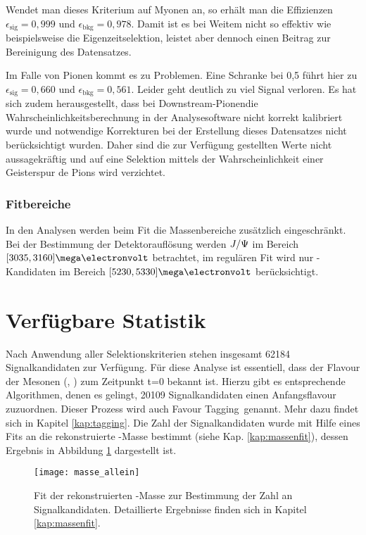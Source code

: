 Wendet man dieses Kriterium auf Myonen an, so erhält man die Effizienzen $\epsilon_{\text{sig}}=0,999$ und $\epsilon_{\text{bkg}}=0,978$. Damit ist es bei Weitem nicht so effektiv wie beispielsweise die Eigenzeitselektion, leistet aber dennoch einen Beitrag zur Bereinigung des Datensatzes.

Im Falle von Pionen kommt es zu Problemen. Eine Schranke bei 0,5 führt hier zu $\epsilon_{\text{sig}}=0,660$ und $\epsilon_{\text{bkg}}=0,561$. Leider geht deutlich zu viel Signal verloren. Es hat sich zudem herausgestellt, dass bei \glqq Downstream-Pionen\grqq die Wahrscheinlichkeitsberechnung in der Analysesoftware nicht korrekt kalibriert wurde und notwendige Korrekturen bei der Erstellung dieses Datensatzes nicht berücksichtigt wurden. Daher sind die zur Verfügung gestellten Werte nicht aussagekräftig und auf eine Selektion mittels der Wahrscheinlichkeit einer Geisterspur de Pions wird verzichtet.

\subsubsection{Fitbereiche}
In den Analysen werden beim Fit die Massenbereiche zusätzlich eingeschränkt. Bei der Bestimmung der Detektorauflösung werden $J/\Psi$ im Bereich $[3035, 3160]\mega\electronvolt$ betrachtet, im regulären Fit wird nur \Bd-Kandidaten im Bereich $[5230, 5330]\mega\electronvolt$ berücksichtigt.

\section{Verfügbare Statistik}
Nach Anwendung aller Selektionskriterien stehen insgesamt 62184 Signalkandidaten zur Verfügung. Für diese Analyse ist essentiell, dass der Flavour der Mesonen (\Bd, \Bdbar) zum Zeitpunkt t=0 bekannt ist. Hierzu gibt es entsprechende Algorithmen, denen es gelingt, 20109 Signalkandidaten einen Anfangsflavour zuzuordnen. Dieser Prozess wird auch \glqq Favour Tagging\grqq\ genannt. Mehr dazu findet sich in Kapitel \ref{kap:tagging}. Die Zahl der Signalkandidaten wurde mit Hilfe eines Fits an die rekonstruierte \Bd-Masse bestimmt (siehe Kap. \ref{kap:massenfit}), dessen Ergebnis in Abbildung \ref{fig:masse_allein} dargestellt ist.
\begin{figure}[hptb]
\centering
\texttt{[image: masse\_allein]}
\caption{Fit der rekonstruierten \Bd-Masse zur Bestimmung der Zahl an Signalkandidaten. Detaillierte Ergebnisse finden sich in Kapitel \ref{kap:massenfit}.}
\label{fig:masse_allein}
\end{figure}